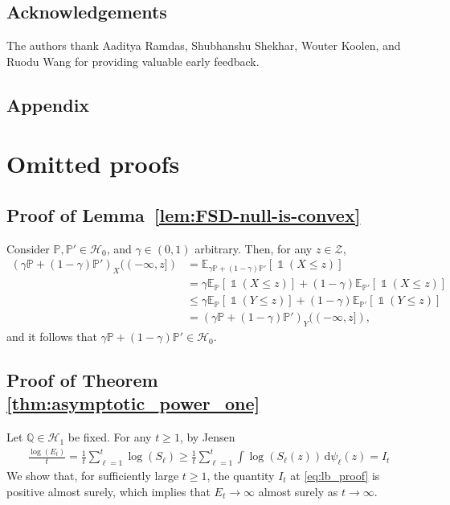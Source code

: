\documentclass[12pt,twoside]{article}
\theoremstyle{plain}
\theoremstyle{definition}
\theoremstyle{remark}
\newcommand{\inparen}[1]{\left(#1\right)}
\DeclareMathOperator*{\indsymb}{\mathds{1}}
\newcommand{\indicator}[1]{\indsymb\inparen{#1}}
\newcommand{\calH}{\mathcal{H}}
\newcommand{\calZ}{\mathcal{Z}}
\newcommand{\Esymb}{\mathbb{E}}
\newcommand{\Psymb}{\mathbb{P}}
\newcommand{\Qsymb}{\mathbb{Q}}
\newcommand{\diff}{\,\mathrm{d}}
\begin{document}

\subsection*{Acknowledgements}
The authors thank Aaditya Ramdas, Shubhanshu Shekhar, Wouter Koolen, and Ruodu Wang for providing valuable early feedback. 






\clearpage

\appendix
\begin{center}\section*{Appendix}\end{center}
\section{Omitted proofs}\label{sec:proofs}
\subsection{Proof of Lemma~\ref{lem:FSD-null-is-convex}}\label{app:proof_FSD_null_is_convex}
Consider $\Psymb,\Psymb'\in \calH_0$, and $\gamma \in (0,1)$ arbitrary. Then, for any $z\in \calZ$,
    \begin{align*}
        \left(\gamma \Psymb + (1-\gamma) \Psymb'\right)_X((-\infty,z])&= \Esymb_{\gamma \Psymb + (1-\gamma) \Psymb'} [\indicator{X \leq z}]\\ &= \gamma\Esymb_{ \Psymb } [\indicator{X \leq z}]+(1-\gamma)\Esymb_{  \Psymb'} [\indicator{X \leq z}] \\
        &\leq \gamma\Esymb_{ \Psymb } [\indicator{Y\leq z}]+(1-\gamma )\Esymb_{  \Psymb'} [\indicator{Y \leq z}] \\
        &= \left(\gamma \Psymb + (1-\gamma) \Psymb'\right)_Y((-\infty,z]),
    \end{align*}
    and it follows that $\gamma \Psymb + (1-\gamma) \Psymb' \in \calH_0.$

    


\subsection{Proof of Theorem \ref{thm:asymptotic_power_one}}\label{app:proof_asymptotic_power_one}

    Let $\Qsymb\in \calH_1$ be fixed. For any $t\geq 1$, by Jensen 
    \begin{align}
        \frac{\log(E_t)}{t}= \frac{1}{t}{\sum_{\ell=1}^t \log(S_\ell)}\geq
\frac{1}{t}\sum_{\ell=1}^t\int  \log(S_\ell(z))\diff \psi_\ell(z)=I_t\label{eq:lb_proof}
    \end{align}
    We show that, for sufficiently large $t\geq 1$, the quantity $I_t$ at \eqref{eq:lb_proof} is positive almost surely, which implies that $E_t\to \infty$ almost surely as $t\to \infty$. 
    
\end{document}
